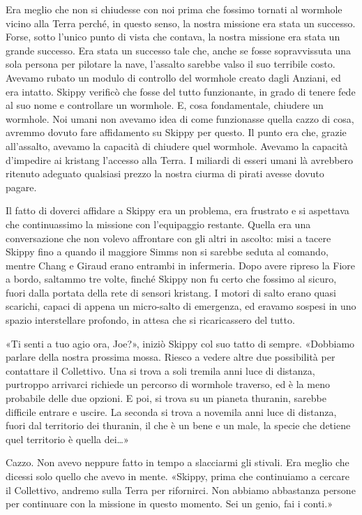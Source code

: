 Era meglio che non si chiudesse con noi prima che fossimo tornati al
wormhole vicino alla Terra perché, in questo senso, la nostra missione
era stata un successo. Forse, sotto l'unico punto di vista che contava,
la nostra missione era stata un grande successo. Era stata un successo
tale che, anche se fosse sopravvissuta una sola persona per pilotare la
nave, l'assalto sarebbe valso il suo terribile costo. Avevamo rubato un
modulo di controllo del wormhole creato dagli Anziani, ed era intatto.
Skippy verificò che fosse del tutto funzionante, in grado di tenere fede
al suo nome e controllare un wormhole. E, cosa fondamentale, chiudere un
wormhole. Noi umani non avevamo idea di come funzionasse quella cazzo di
cosa, avremmo dovuto fare affidamento su Skippy per questo. Il punto era
che, grazie all'assalto, avevamo la capacità di chiudere quel wormhole.
Avevamo la capacità d'impedire ai kristang l'accesso alla Terra. I
miliardi di esseri umani là avrebbero ritenuto adeguato qualsiasi prezzo
la nostra ciurma di pirati avesse dovuto pagare.

Il fatto di doverci affidare a Skippy era un problema, era frustrato e
si aspettava che continuassimo la missione con l'equipaggio restante.
Quella era una conversazione che non volevo affrontare con gli altri in
ascolto: misi a tacere Skippy fino a quando il maggiore Simms non si
sarebbe seduta al comando, mentre Chang e Giraud erano entrambi in
infermeria. Dopo avere ripreso la Fiore a bordo, saltammo tre volte,
finché Skippy non fu certo che fossimo al sicuro, fuori dalla portata
della rete di sensori kristang. I motori di salto erano quasi scarichi,
capaci di appena un micro-salto di emergenza, ed eravamo sospesi in uno
spazio interstellare profondo, in attesa che si ricaricassero del tutto.

«Ti senti a tuo agio ora, Joe?», iniziò Skippy col suo tatto di sempre.
«Dobbiamo parlare della nostra prossima mossa. Riesco a vedere altre due
possibilità per contattare il Collettivo. Una si trova a soli tremila
anni luce di distanza, purtroppo arrivarci richiede un percorso di
wormhole traverso, ed è la meno probabile delle due opzioni. E poi, si
trova su un pianeta thuranin, sarebbe difficile entrare e uscire. La
seconda si trova a novemila anni luce di distanza, fuori dal territorio
dei thuranin, il che è un bene e un male, la specie che detiene quel
territorio è quella dei\ldots»

Cazzo. Non avevo neppure fatto in tempo a slacciarmi gli stivali. Era
meglio che dicessi solo quello che avevo in mente. «Skippy, prima che
continuiamo a cercare il Collettivo, andremo sulla Terra per rifornirci.
Non abbiamo abbastanza persone per continuare con la missione in questo
momento. Sei un genio, fai i conti.»

